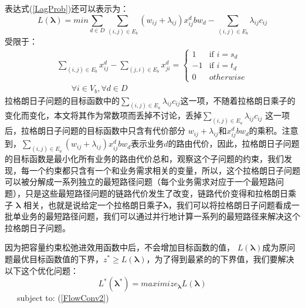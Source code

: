 表达式(\ref{LagProb})还可以表示为：
\begin{equation}\label{Lagprob1}
L(\mathbf{\lambda})= min\sum\limits_{d \in D}\sum\limits_{(i,j) \in E_b} (w_{ij}+\lambda_{ij})x_{ij}^dbw_d -\sum\limits_{(i,j) \in E_b}\lambda_{ij}c_{ij}
\end{equation}
受限于：
\begin{equation}\label{FlowConv2}
\begin{split}
\sum\limits_{(i,j) \in E_b} x_{ij}^d - \sum\limits_{(j,i) \in E_b} x_{ji}^d
=\begin{cases}
1 & \text{if $i = s_d$}\\
-1 & \text{if $i = t_d$} \\
0 &{otherwise}
\end{cases}
\\~~~~~~~~\forall i\in V_b, \forall d\in D
\end{split}
\end{equation}
拉格朗日子问题的目标函数中的$\sum_{(i,j) \in E_a}\lambda_{ij}c_{ij}$这一项，不随着拉格朗日乘子的变化而变化，本文将其作为常数项而丢掉不讨论，丢掉$\sum_{(i,j) \in E_a}\lambda_{ij}c_{ij}$ 这一项后，拉格朗日子问题的目标函数中只含有代价部分 $w_{ij}+\lambda_{ij}$和$x_{ij}^d bw_d$的乘积。注意到，$\sum_{(i,j) \in E_a} (w_{ij}+\lambda_{ij})x_{ij}^d bw_d$表示业务$d$的路由代价，因此，拉格朗日子问题的目标函数是最小化所有业务的路由代价总和，观察这个子问题的约束，我们发现，每一个约束都只含有一个和业务需求相关的变量，所以，这个拉格朗日子问题可以被分解成一系列独立的最短路径问题（每个业务需求对应于一个最短路问题），只是这些最短路径问题的链路代价发生了改变，链路代价变得和拉格朗日乘子 $\mathbf{\lambda}$ 相关，也就是说给定一个拉格朗日乘子$\mathbf{\lambda}$，我们可以将拉格朗日子问题看成一批单业务的最短路径问题，我们可以通过并行地计算一系列的最短路径来解决这个拉格朗日子问题。

因为把容量约束松弛进效用函数中后，不会增加目标函数的值， $L(\mathbf{\lambda})$成为原问题最优目标函数值的下界，$z^* \ge L(\mathbf{\lambda})$，为了得到最紧的的下界值，我们要解决以下这个优化问题：
\begin{equation}\label{dual}
L^*(\mathbf{\lambda^*}) = maximize_{\mathbf{\lambda}}L(\mathbf{\lambda})
\end{equation}
~~~subject to: (\ref{FlowConv2})
\vskip 0.2cm

